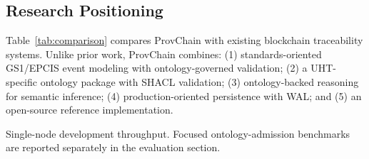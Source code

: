 \documentclass[preprint,review,12pt,authoryear]{elsarticle}
\begin{document}
\subsection{Research Positioning}

Table~\ref{tab:comparison} compares ProvChain with existing blockchain traceability systems. Unlike prior work, ProvChain combines: (1) standards-oriented GS1/EPCIS event modeling with ontology-governed validation; (2) a UHT-specific ontology package with SHACL validation; (3) ontology-backed reasoning for semantic inference; (4) production-oriented persistence with WAL; and (5) an open-source reference implementation.

\begin{table}[htbp]
\centering
\caption{Comparison of Blockchain Traceability Systems}
\label{tab:comparison}
\vspace{1mm}

{\footnotesize * Single-node development throughput. Focused ontology-admission benchmarks are reported separately in the evaluation section.}
\end{table}
\end{document}
